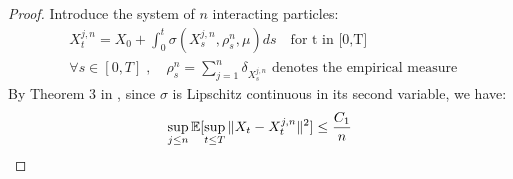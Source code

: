 \begin{proof} 
	Introduce the system of $n$ interacting particles:
	\begin{align}\label{eq:intermediary_process}
	&X_t^{j,n}=X_{0}+\int_{0}^t \sigma(X_s^{j,n}, \rho_s^n, \mu)ds \quad \text{for t in [0,T]}\\
	&\forall s \in [0,T]\;,\quad \rho_s^n=\sum_{j=1}^{n} \delta_{X_s^{j,n}} \text{ denotes the empirical measure } 
	\end{align}
	By Theorem 3 in \cite{jourdain2007nonlinear}, since $\sigma$ is Lipschitz continuous in its second variable, we have:	
	\begin{equation}\label{eq:upp_bound1}
	\sup_{j \le n}{{\mathbb E}}[\sup_{t\le T}\| X_t - X_t^{j,n}\|^2]\le \frac{C_1}{n}
	\end{equation}
	

\end{proof}
